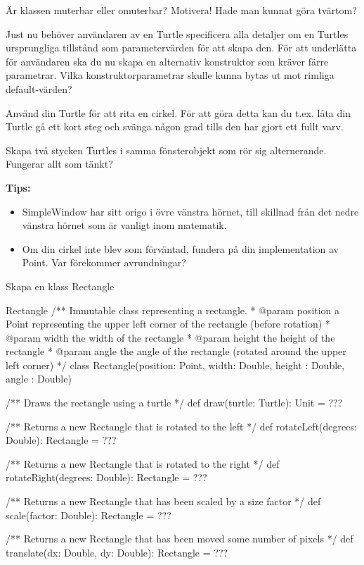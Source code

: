 \Subtask Är klassen muterbar eller omuterbar? Motivera! Hade man kunnat göra tvärtom?

\Subtask Just nu behöver användaren av en Turtle specificera alla detaljer om en Turtles ursprungliga tillstånd som parametervärden för att skapa den. För att underlätta för användaren ska du nu skapa en alternativ konstruktor som kräver färre parametrar. Vilka konstruktorparametrar skulle kunna bytas ut mot rimliga default-värden?

\Subtask Använd din Turtle för att rita en cirkel. För att göra detta kan du t.ex. låta din Turtle gå ett kort steg och svänga någon grad tills den har gjort ett fullt varv.

\Subtask Skapa två stycken Turtles i samma fönsterobjekt som rör sig alternerande. Fungerar allt som tänkt?

\textbf{Tips:}
\begin{itemize}
\item SimpleWindow har sitt origo i övre vänstra hörnet, till skillnad från det nedre vänstra hörnet som är vanligt inom matematik.
\item Om din cirkel inte blev som förväntad, fundera på din implementation av Point. Var förekommer avrundningar?
\end{itemize}

\Task Skapa en klass Rectangle
\begin{ScalaSpec}{Rectangle}
/** Immutable class representing a rectangle.
  * @param position a Point representing the upper left corner of the
                    rectangle (before rotation)
  * @param width    the width of the rectangle
  * @param height   the height of the rectangle
  * @param angle    the angle of the rectangle (rotated around
                    the upper left corner)
  */
class Rectangle(position: Point, width: Double,
                height : Double, angle : Double) {
  /** Draws the rectangle using a turtle */
  def draw(turtle: Turtle): Unit = ???

  /** Returns a new Rectangle that is rotated to the left */
  def rotateLeft(degrees: Double): Rectangle = ???

  /** Returns a new Rectangle that is rotated to the right */
  def rotateRight(degrees: Double): Rectangle = ???

  /** Returns a new Rectangle that has been scaled by a size factor */
  def scale(factor: Double): Rectangle = ???

  /** Returns a new Rectangle that has been moved some number of pixels */
  def translate(dx: Double, dy: Double): Rectangle = ???
}
\end{ScalaSpec}

